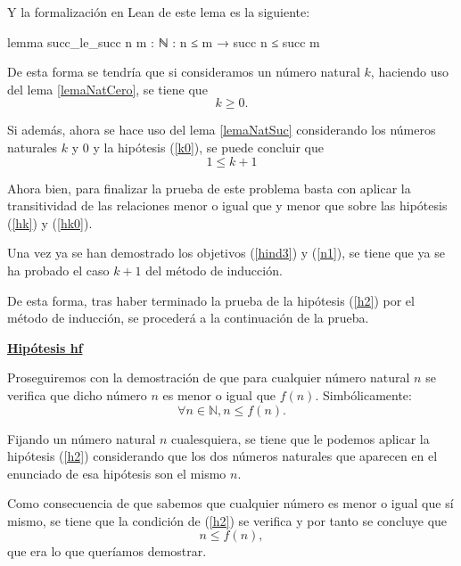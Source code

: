 \begin{demostracion}
\begin{itemize}
\begin{enumerate}
        Y la formalización en Lean de este lema es la siguiente:
        \begin{leancode}
          lemma succ_le_succ {n m : ℕ} : n ≤ m → succ n ≤ succ m
        \end{leancode}

        De esta forma se tendría que si consideramos un número
        natural \(k\), haciendo uso del lema \ref{lemaNatCero}, se
        tiene que
        \begin{equation}\label{k0}
          k≥0.
        \end{equation}

        Si además, ahora se hace uso del lema \ref{lemaNatSuc}
        considerando los números naturales \(k\) y \(0\) y la
        hipótesis (\ref{k0}), se puede concluir que
        \begin{equation}\label{hk0}\tag{hk0}
          1≤k+1
        \end{equation}

        Ahora bien, para finalizar la prueba de este problema basta
        con aplicar la transitividad de las relaciones menor o igual que
        y menor que sobre las hipótesis (\ref{hk}) y (\ref{hk0}).

      \end{enumerate}

    Una vez ya se han demostrado los objetivos (\ref{hind3}) y
    (\ref{n1}), se tiene que ya se ha probado el caso \(k+1\) del
    método de inducción.
    \end{itemize}

  De esta forma, tras haber terminado la prueba de la hipótesis
  (\ref{h2}) por el método de inducción, se procederá a la
  continuación de la prueba. 

  \noindent
  \textbf{\underline{Hipótesis hf}}
  
  Proseguiremos con la demostración de que para cualquier número
  natural \(n\) se verifica que dicho número \(n\) es menor o igual
  que \(f(n)\). Simbólicamente:
  \begin{equation}\label{hf}\tag{hf}
    ∀n∈ ℕ, n≤f(n).
  \end{equation}

  Fijando un número natural \(n\) cualesquiera, se tiene que le
  podemos aplicar la hipótesis (\ref{h2}) considerando que los dos
  números naturales que aparecen en el enunciado de esa hipótesis
  son el mismo \(n\).

  Como consecuencia de que sabemos que cualquier número es menor
  o igual que sí mismo, se tiene que la condición de (\ref{h2}) se
  verifica y por tanto se concluye que
  \begin{equation}
    n≤f(n),
  \end{equation}
  que era lo que queríamos demostrar.


\end{demostracion}
